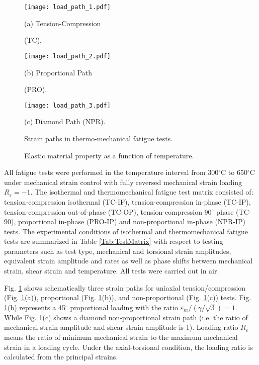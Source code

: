\documentclass[preprint,5p,twocolumn,11pt,sort&compress]{elsarticle}
\begin{document}
\begin{figure}
  \begin{minipage}[t]{0.5\linewidth}
  \nonumber
    \centering
    \texttt{[image: load\_path\_1.pdf]}
    \centerline{\small (a) Tension-Compression}
    \centerline{\small (TC).}
  \end{minipage}%
  \begin{minipage}[t]{0.5\linewidth}
    \centering
    \texttt{[image: load\_path\_2.pdf]}
    \centerline{\small (b) Proportional Path}
    \centerline{\small (PRO).}
  \end{minipage}
  \centering
  \begin{minipage}[t]{0.5\linewidth}
  \nonumber
    \centering
    \texttt{[image: load\_path\_3.pdf]}
    \centerline{\small (c) Diamond Path (NPR).}
  \end{minipage}%
  \caption{Strain paths in thermo-mechanical fatigue tests.}
  \label{Fig:LoadPath}
\end{figure}

\begin{figure}[!htp]
\caption{Elastic material property as a function of temperature.}
\label{Fig:plot_elastic_by_temperature_in718}
\end{figure}

All fatigue tests were performed in the temperature interval from 300$^\circ$C to 650$^\circ$C under mechanical strain control with fully reversed mechanical strain loading $R_{\varepsilon}=-1$. The isothermal and thermomechanical fatigue test matrix consisted of: tension-compression isothermal (TC-IF), tension-compression in-phase (TC-IP), tension-compression out-of-phase (TC-OP), tension-compression 90$^\circ$ phase (TC-90), proportional in-phase (PRO-IP) and non-proportional in-phase (NPR-IP) tests. The experimental conditions of isothermal and thermomechanical fatigue tests are summarized in Table \ref{Tab:TestMatrix} with respect to testing parameters such as test type, mechanical and torsional strain amplitudes, equivalent strain amplitude and rates as well as phase shifts between mechanical strain, shear strain and temperature. All tests were carried out in air. 

Fig. \ref{Fig:LoadPath} shows schematically three strain paths for uniaxial tension/compression (Fig. \ref{Fig:LoadPath}(a)), proportional (Fig. \ref{Fig:LoadPath}(b)), and non-proportional (Fig. \ref{Fig:LoadPath}(c)) tests. Fig. \ref{Fig:LoadPath}(b) represents a 45$^\circ$ proportional loading with the ratio $\varepsilon_{m}/(\gamma/\sqrt{3})=1$. While Fig. \ref{Fig:LoadPath}(c) shows a diamond non-proportional strain path (i.e. the ratio of mechanical strain amplitude and shear strain amplitude is 1). Loading ratio $R_\varepsilon$ means the ratio of minimum mechanical strain to the maximum mechanical strain in a loading cycle. Under the axial-torsional condition, the loading ratio is calculated from the principal strains. 
\end{document}
